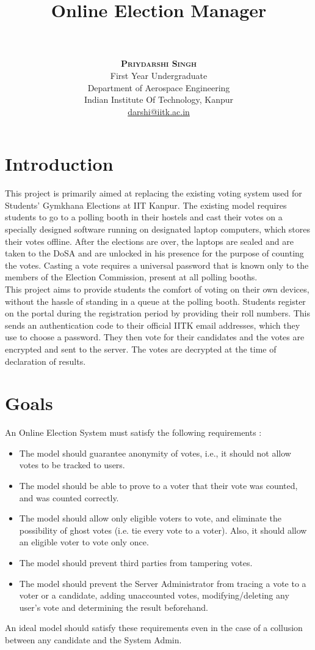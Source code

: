 \documentclass[twoside,twocolumn]{article}
\title{
    \textbf{Online Election Manager}
}
\author{
    \\
    \\
    \textbf{\textsc{Priydarshi Singh}}\\
    \normalsize First Year Undergraduate \\
    \normalsize Department of Aerospace Engineering \\
    \normalsize Indian Institute Of Technology, Kanpur \\
    \normalsize \href{mailto:darshi@iitk.ac.in}{darshi@iitk.ac.in}
}
\date{}
\newcommand\tab[1][1cm]{\hspace*{#1}}
\begin{document}
\maketitle

\section{Introduction}
    \tab This project is primarily aimed at replacing the existing voting system used for Students' Gymkhana Elections at IIT Kanpur. The existing model requires students to go to a polling booth in their hostels and cast their votes on a specially designed software running on designated laptop computers, which stores their votes offline. After the elections are over, the laptops are sealed and are taken to the DoSA and are unlocked in his presence for the purpose of counting the votes. Casting a vote requires a universal password that is known only to the members of the Election Commission, present at all polling booths. \\
    \tab This project aims to provide students the comfort of voting on their own devices, without the hassle of standing in a queue at the polling booth. Students register on the portal during the registration period by providing their roll numbers. This sends an authentication code to their official IITK email addresses, which they use to choose a password. They then vote for their candidates and the votes are encrypted and sent to the server. The votes are decrypted at the time of declaration of results.

\section{Goals}
    \tab An Online Election System must satisfy the following requirements :
    \begin{itemize}
        \item The model should guarantee anonymity of votes, i.e., it should not allow votes to be tracked to users.
        \item The model should be able to prove to a voter that their vote was counted, and was counted correctly.
        \item The model should allow only eligible voters to vote, and eliminate the possibility of ghost votes (i.e. tie every vote to a voter). Also, it should allow an eligible voter to vote only once.
        \item The model should prevent third parties from tampering votes.
        \item The model should prevent the Server Administrator from tracing a vote to a voter or a candidate, adding unaccounted votes, modifying/deleting any user's vote and determining the result beforehand.
    \end{itemize}
    \tab An ideal model should satisfy these requirements even in the case of a collusion between any candidate and the System Admin.
\end{document}

